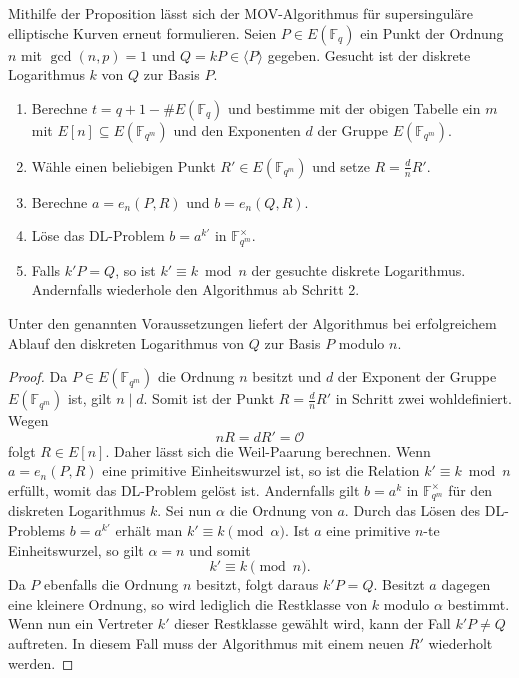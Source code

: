Mithilfe der Proposition lässt sich der MOV-Algorithmus für supersinguläre elliptische Kurven erneut formulieren. Seien $P\in E(\mathbb{F}_q)$ ein Punkt der Ordnung $n$ mit $\gcd(n,p)=1$ und $Q=kP\in\langle P\rangle$ gegeben. Gesucht ist der diskrete Logarithmus $k$ von $Q$ zur Basis $P$.
\begin{enumerate}
    \item Berechne $t=q+1-\#E(\mathbb{F}_q)$ und bestimme mit der obigen Tabelle ein $m$ mit $E[n]\subseteq E(\mathbb{F}_{q^m})$ und den Exponenten $d$ der Gruppe $E(\mathbb{F}_{q^m})$.
    \item Wähle einen beliebigen Punkt $R'\in E(\mathbb{F}_{q^m})$ und setze $R=\frac{d}{n}R'$.
    \item Berechne $a=e_n(P,R)$ und $b=e_n(Q,R)$.
    \item Löse das DL-Problem $b=a^{k'}$ in $\mathbb{F}_{q^m}^\times$.
    \item Falls $k'P=Q$, so ist $k'\equiv k\bmod n$ der gesuchte diskrete Logarithmus. Andernfalls wiederhole den Algorithmus
    ab Schritt 2.
\end{enumerate}
\begin{proposition}
    Unter den genannten Voraussetzungen liefert der Algorithmus bei erfolgreichem Ablauf den diskreten Logarithmus von $Q$ zur Basis $P$ modulo $n$.
\end{proposition}
\begin{proof}
     Da $P\in E(\mathbb{F}_{q^m})$ die Ordnung $n$ besitzt und $d$ der Exponent der Gruppe $E(\mathbb{F}_{q^m})$ ist, gilt $n\mid d$. Somit ist der Punkt $R=\frac{d}{n}R'$ in Schritt zwei wohldefiniert. Wegen
    \[
    nR=dR'=\mathcal{O}
    \]
    folgt $R\in E[n]$. Daher lässt sich die Weil-Paarung berechnen. Wenn $a=e_n(P,R)$ eine primitive Einheitswurzel ist, so ist die Relation $k'\equiv k\bmod n$ erfüllt, womit das DL-Problem gelöst ist. Andernfalls gilt $b=a^k$ in $\mathbb{F}_{q^m}^\times$ für den diskreten Logarithmus $k$. Sei nun $\alpha$ die Ordnung von $a$. Durch das Lösen des DL-Problems $b=a^{k'}$ erhält man \(k'\equiv k\pmod{\alpha}\). Ist $a$ eine primitive $n$-te Einheitswurzel, so gilt $\alpha=n$ und somit
    \[
        k'\equiv k\pmod n.
    \]
    Da $P$ ebenfalls die Ordnung $n$ besitzt, folgt daraus $k'P=Q$. Besitzt $a$ dagegen eine kleinere Ordnung,
    so wird lediglich die Restklasse von $k$ modulo $\alpha$ bestimmt. Wenn nun ein Vertreter $k'$ dieser Restklasse gewählt wird, kann der Fall $k'P\neq Q$ auftreten. In diesem Fall muss der Algorithmus mit einem neuen $R'$ wiederholt werden.
\end{proof}

